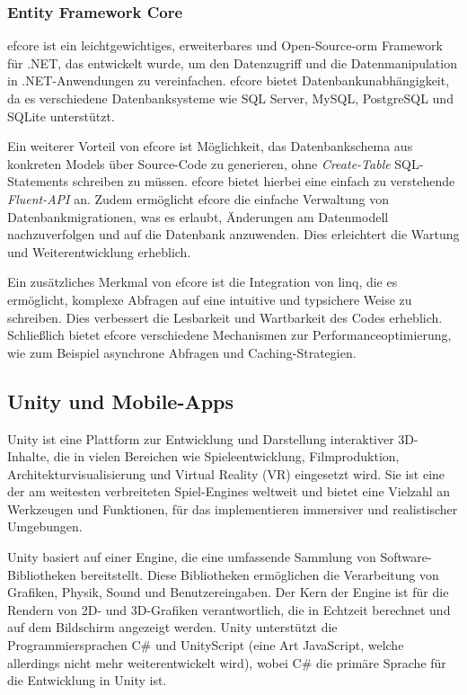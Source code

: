 \subsubsection{Entity Framework Core}

\ac{efcore} ist ein leichtgewichtiges, erweiterbares und Open-Source-\ac{orm} Framework für .NET, das entwickelt wurde, um den Datenzugriff und die Datenmanipulation in .NET-Anwendungen zu vereinfachen. \ac{efcore} bietet Datenbankunabhängigkeit, da es verschiedene Datenbanksysteme wie SQL Server, MySQL, PostgreSQL und SQLite unterstützt.

Ein weiterer Vorteil von \ac{efcore} ist Möglichkeit, das Datenbankschema aus konkreten Models über Source-Code zu generieren, ohne \textit{Create-Table} SQL-Statements schreiben zu müssen. \ac{efcore} bietet hierbei eine einfach zu verstehende \textit{Fluent-API} an. Zudem ermöglicht \ac{efcore} die einfache Verwaltung von Datenbankmigrationen, was es erlaubt, Änderungen am Datenmodell nachzuverfolgen und auf die Datenbank anzuwenden. Dies erleichtert die Wartung und Weiterentwicklung erheblich.

Ein zusätzliches Merkmal von \ac{efcore} ist die Integration von \ac{linq}, die es ermöglicht, komplexe Abfragen auf eine intuitive und typsichere Weise zu schreiben. Dies verbessert die Lesbarkeit und Wartbarkeit des Codes erheblich. Schließlich bietet \ac{efcore} verschiedene Mechanismen zur Performanceoptimierung, wie zum Beispiel asynchrone Abfragen und Caching-Strategien.

\subsection{Unity und Mobile-Apps}

Unity ist eine Plattform zur Entwicklung und Darstellung interaktiver 3D-Inhalte, die in vielen Bereichen wie Spieleentwicklung, Filmproduktion, Architekturvisualisierung und Virtual Reality (VR) eingesetzt wird. Sie ist eine der am weitesten verbreiteten Spiel-Engines weltweit und bietet eine Vielzahl an Werkzeugen und Funktionen, für das implementieren immersiver und realistischer Umgebungen.

Unity basiert auf einer Engine, die eine umfassende Sammlung von Software-Bibliotheken bereitstellt. Diese Bibliotheken ermöglichen die Verarbeitung von Grafiken, Physik, Sound und Benutzereingaben. Der Kern der Engine ist für die Rendern von 2D- und 3D-Grafiken verantwortlich, die in Echtzeit berechnet und auf dem Bildschirm angezeigt werden. Unity unterstützt die Programmiersprachen C\# und UnityScript (eine Art JavaScript, welche allerdings nicht mehr weiterentwickelt wird), wobei C\#  die primäre Sprache für die Entwicklung in Unity ist.

